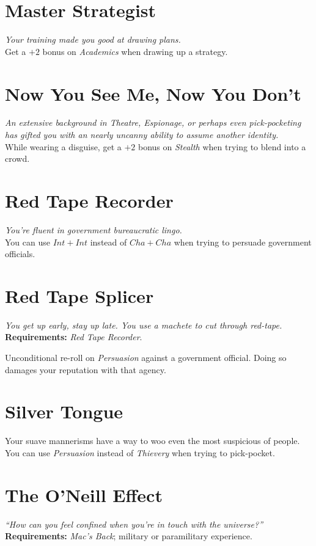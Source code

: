 \section{Master Strategist}
\textit{Your training made you good at drawing plans.}\\
Get a $+2$ bonus on \textit{Academics} when drawing up a strategy.

\section{Now You See Me, Now You Don't}
\textit{An extensive background in Theatre, Espionage, or perhaps even pick-pocketing has gifted you with an nearly uncanny ability to assume another identity.}\\
While wearing a disguise, get a $+2$ bonus on \textit{Stealth} when trying to blend into a crowd.

\section{Red Tape Recorder}
\textit{You're fluent in government bureaucratic lingo.}\\ 
You can use $Int + Int$ instead of $Cha + Cha$ when trying to persuade government officials.

\section{Red Tape Splicer}
\textit{You get up early, stay up late. You use a machete to cut through red-tape.}\\
\textbf{Requirements:} \textit{Red Tape Recorder}.

Unconditional re-roll on \textit{Persuasion} against a government official.
Doing so damages your reputation with that agency.

\section{Silver Tongue}
Your suave mannerisms have a way to woo even the most suspicious of people.
You can use \textit{Persuasion} instead of \textit{Thievery} when trying to pick-pocket.

\section{The O'Neill Effect}
\textit{``How can you feel confined when you're in touch with the universe?''}\\
\textbf{Requirements:} \textit{Mac's Back}; military or paramilitary experience. 

